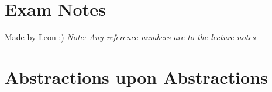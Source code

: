 \documentclass[landscape, 8pt]{extarticle}
\begin{document}
\setlength{\abovedisplayskip}{3.5pt}
\setlength{\belowdisplayskip}{3.5pt}
\setlength{\abovedisplayshortskip}{3.5pt}
\setlength{\belowdisplayshortskip}{3.5pt}

\begin{multicols}{3}
\raggedcolumns


\section*{\huge Exam Notes}
Made by Leon :) \textit{Note: Any reference numbers are to the lecture notes}

\vspace{-5pt}
\section{Abstractions upon Abstractions}

\lipsum[1-12]
\end{multicols}
\end{document}
